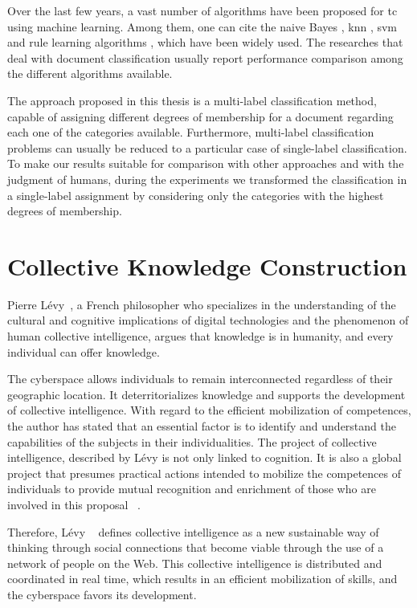 Over the last few years, a vast number of algorithms have been proposed for \gls{tc} using machine learning. Among them, one can cite the naive Bayes \cite{mccallum1998comparison}, \gls{knn} \cite{Rijsbergen:1979}, \gls{svm} \cite{joachims1998text} and rule learning algorithms \cite{slattery1998combining}, which have been widely used. The researches that deal with document classification usually report performance comparison among the different algorithms available.

The approach proposed in this thesis is a multi-label classification method, capable of assigning different degrees of membership for a document regarding each one of the categories available. Furthermore, multi-label classification problems can usually be reduced to a particular case of single-label classification\cite{Sebastiani:2002}. To make our results suitable for comparison with other approaches and with the judgment of humans, during the experiments we transformed the classification in a single-label assignment by considering only the categories with the highest degrees of membership. 


\section{\hspace*{3pt} Collective Knowledge Construction}

Pierre Lévy~\cite{levy1997collective}, a French philosopher who specializes in the understanding of the cultural and cognitive implications of digital technologies and the phenomenon of human collective intelligence, argues that knowledge is in humanity, and every individual can offer knowledge.

The cyberspace allows individuals to remain interconnected regardless of their geographic location. It deterritorializes knowledge and supports the development of collective intelligence. With regard to the efficient mobilization of competences, the author has stated that an essential factor is to identify and understand the capabilities of the subjects in their individualities. The project of collective intelligence, described by Lévy is not only linked to cognition.  It is also a global project that presumes practical actions intended to mobilize the competences of individuals to provide mutual recognition and enrichment of those who are involved in this proposal ~\cite{levy1997collective}.

Therefore, Lévy ~\cite{levy2001cyberculture} defines collective intelligence as a new sustainable way of thinking through social connections that become viable through the use of a network of people on the Web. This collective intelligence is distributed and coordinated in real time, which results in an efficient mobilization of skills, and the cyberspace favors its development.

